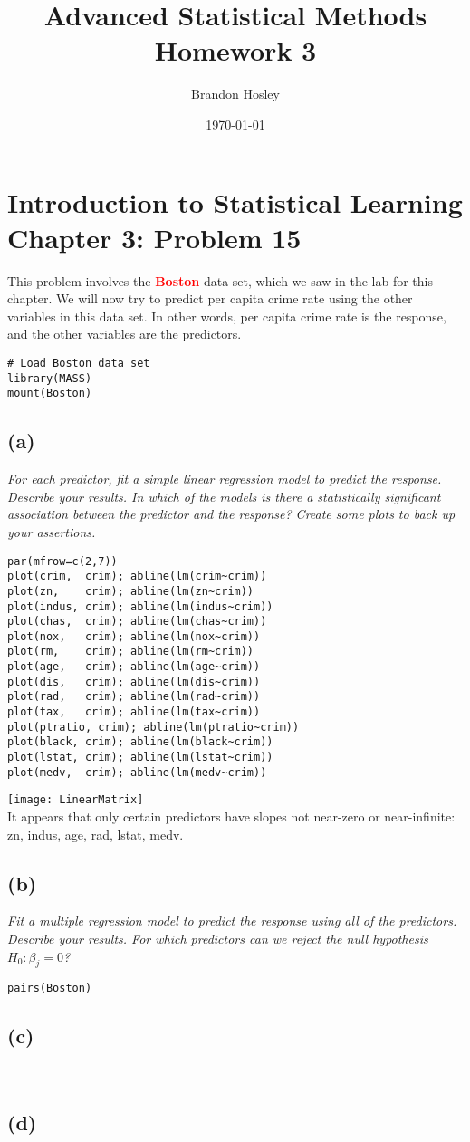 \documentclass[a4paper,man,natbib]{apa6}
\title{Advanced Statistical Methods Homework 3}
\author{Brandon Hosley}
\date{\today}
\affiliation{University of Illinois - Springfield}
\begin{document}
\maketitle
\singlespacing

\section{Introduction to Statistical Learning \\ Chapter 3: Problem 15}
This problem involves the \textbf{\textcolor{red}{Boston}} data set, 
which we saw in the lab for this chapter. 
We will now try to predict per capita crime rate
using the other variables in this data set. 
In other words, per capita crime rate is the response, 
and the other variables are the predictors.

\begin{verbatim}
# Load Boston data set
library(MASS)
mount(Boston)
\end{verbatim}

\subsection{(a)} 
\emph{
	For each predictor, 
	fit a simple linear regression model to predict the response. 
	Describe your results. 
	In which of the models is there a statistically significant association
	between the predictor and the response? 
	Create some plots to back up your assertions.} \\
\begin{verbatim}
par(mfrow=c(2,7))
plot(crim,  crim); abline(lm(crim~crim)) 
plot(zn,    crim); abline(lm(zn~crim)) 
plot(indus, crim); abline(lm(indus~crim)) 
plot(chas,  crim); abline(lm(chas~crim))
plot(nox,   crim); abline(lm(nox~crim)) 
plot(rm,    crim); abline(lm(rm~crim))  
plot(age,   crim); abline(lm(age~crim))  
plot(dis,   crim); abline(lm(dis~crim))  
plot(rad,   crim); abline(lm(rad~crim))  
plot(tax,   crim); abline(lm(tax~crim))    
plot(ptratio, crim); abline(lm(ptratio~crim))
plot(black, crim); abline(lm(black~crim))
plot(lstat, crim); abline(lm(lstat~crim))
plot(medv,  crim); abline(lm(medv~crim))
\end{verbatim}
\texttt{[image: LinearMatrix]} \\
It appears that only certain predictors have slopes not near-zero or near-infinite:
zn, indus, age, rad, lstat, medv.

\subsection{(b)}
\emph{Fit a multiple regression model to predict the response using
	all of the predictors. Describe your results. For which predictors
	can we reject the null hypothesis $H_0 : \beta_j = 0$?
}
\begin{verbatim}
pairs(Boston)
\end{verbatim}

\subsection{(c)}
\emph{} \\

\subsection{(d)}
\emph{} \\
\end{document}
